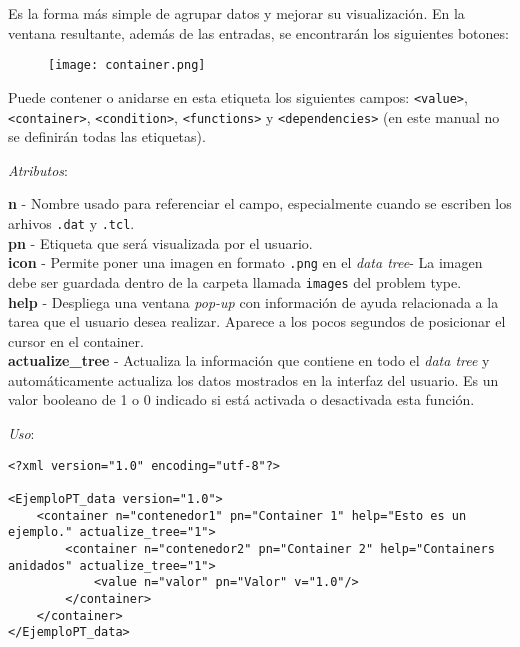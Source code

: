\documentclass[10pt, a4paper, twocolumn]{article} %
\begin{document}
Es la forma más simple de agrupar datos y mejorar su visualización. En la ventana resultante, además de las entradas, se encontrarán los siguientes botones:

\begin{figure}[hbtp!]
	\centering
	\texttt{[image: container.png]}
\end{figure}

Puede contener o anidarse en esta etiqueta los siguientes campos: \texttt{<value>}, \texttt{<container>}, \texttt{<condition>}, \texttt{<functions>} y \texttt{<dependencies>} (en este manual no se definirán todas las etiquetas).

\vspace{0.15cm}
\textit{Atributos}:

\vspace{0.15cm}
	\textbf{n} - Nombre usado para referenciar el campo, especialmente cuando se escriben los arhivos \texttt{.dat} y \texttt{.tcl}.\\
	\textbf{pn} - Etiqueta que será visualizada por el usuario.\\
	\textbf{icon} - Permite poner una imagen en formato \texttt{.png} en el \textit{data tree}- La imagen debe ser guardada dentro de la carpeta llamada \texttt{images} del problem type.\\
	\textbf{help} - Despliega una ventana \textit{pop-up} con información de ayuda relacionada a la tarea que el usuario desea realizar. Aparece a los pocos segundos de posicionar el cursor en el container.\\
	\textbf{actualize\_tree} - Actualiza la información que contiene en todo el \textit{data tree} y automáticamente actualiza los datos mostrados en la interfaz del usuario. Es un valor booleano de 1 o 0 indicado si está activada o desactivada esta función.
\vspace{0.15cm}

\textit{Uso}:
\vspace{0.15cm}

\lstset{language=XML} 
\begin{lstlisting}
<?xml version="1.0" encoding="utf-8"?>

<EjemploPT_data version="1.0">
	<container n="contenedor1" pn="Container 1" help="Esto es un ejemplo." actualize_tree="1">
		<container n="contenedor2" pn="Container 2" help="Containers anidados" actualize_tree="1">
			<value n="valor" pn="Valor" v="1.0"/>
		</container>
	</container>
</EjemploPT_data>
\end{lstlisting}
\end{document}
